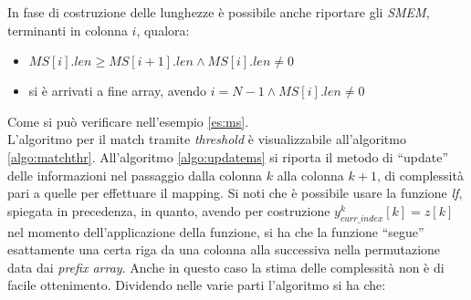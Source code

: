 In fase di costruzione delle lunghezze è possibile anche riportare gli
\textit{SMEM}, terminanti in colonna $i$, qualora:
\begin{itemize}
  \item $MS[i].len\geq MS[i+1].len \land MS[i].len\neq 0$
  \item si è arrivati a fine array, avendo $i=N-1\land MS[i].len\neq 0$
\end{itemize}
Come si può verificare nell'esempio \ref{es:ms}.\\
L'algoritmo per il match tramite \textit{threshold} è visualizzabile
all'algoritmo \ref{algo:matchthr}. All'algoritmo \ref{algo:updatems}
si riporta il metodo di ``update'' delle informazioni nel passaggio dalla
colonna 
$k$ alla colonna $k+1$, di complessità pari a quelle per effettuare il
mapping. Si noti che è 
possibile usare la funzione \textit{lf}, 
spiegata in precedenza, in quanto, avendo per costruzione
$y^k_{curr\_index}[k]=z[k]$ nel momento dell'applicazione della funzione, si ha
che la funzione ``segue'' esattamente una certa riga da una colonna alla
successiva nella permutazione data dai \textit{prefix array}. 
Anche in questo caso la stima delle
complessità non è di facile ottenimento. Dividendo nelle varie parti l'algoritmo
si ha che:
